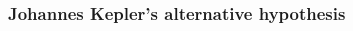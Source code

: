 \documentclass{beamer}
\begin{document}
\begin{frame}
  \frametitle{Johannes Kepler's alternative hypothesis}
  \begin{columns}
    \begin{column}{0.5\textwidth}
    \end{column}
    \begin{column}{0.5\textwidth}
\end{column}
\end{columns}
\end{frame}
\end{document}
